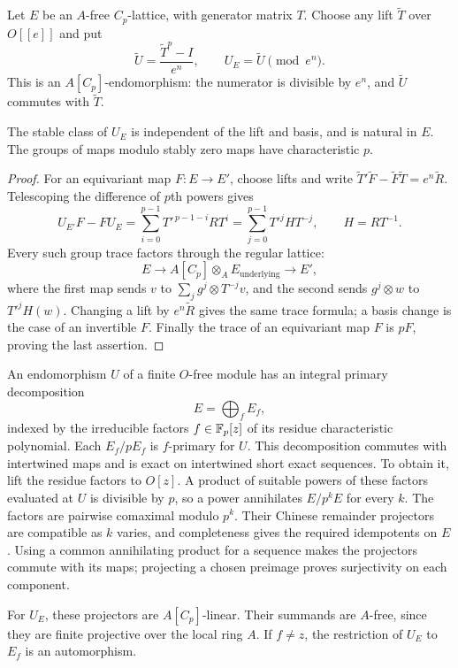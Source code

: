 Let $E$ be an $A$-free $C_p$-lattice, with generator matrix $T$.
Choose any lift $\widetilde T$ over $O[[e]]$ and put
\[
 \widetilde U=\frac{\widetilde T^p-I}{e^n},\qquad
 U_E=\widetilde U\pmod{e^n}.
\]
This is an $A[C_p]$-endomorphism: the numerator is divisible
by $e^n$, and $\widetilde U$ commutes with $\widetilde T$.

\begin{lemma}\label{lem:truncation-stable-curvature}
The stable class of $U_E$ is independent of the lift and basis,
and is natural in $E$.  The groups of maps modulo stably zero maps
have characteristic $p$.
\end{lemma}

\begin{proof}
For an equivariant map $F:E\to E'$, choose lifts and write
$\widetilde T'\widetilde F-\widetilde F\widetilde T=e^n\widetilde R$.
Telescoping the difference of $p$th powers gives
\[
 U_{E'}F-FU_E
  =\sum_{i=0}^{p-1}T'^{\,p-1-i}RT^i
  =\sum_{j=0}^{p-1}T'^j H T^{-j},\qquad H=RT^{-1}.
\]
Every such group trace factors through the regular lattice:
\[
 E\longrightarrow A[C_p]\otimes_A E_{\mathrm{underlying}}
       \longrightarrow E',
\]
where the first map sends $v$ to
$\sum_jg^j\otimes T^{-j}v$, and the second sends
$g^j\otimes w$ to $T'^jH(w)$.
Changing a lift by $e^n\widetilde R$ gives the same trace formula;
a basis change is the case of an invertible $F$.
Finally the trace of an equivariant map $F$ is $pF$, proving the
last assertion.
\end{proof}

An endomorphism $U$ of a finite $O$-free module has an integral
primary decomposition
\[
 E=\bigoplus_f E_f,
\]
indexed by the irreducible factors $f\in\mathbb F_p[z]$ of its residue
characteristic polynomial.  Each $E_f/pE_f$ is $f$-primary for $U$.
This decomposition commutes with intertwined maps and is exact on
intertwined short exact sequences.  To obtain it, lift the residue
factors to $O[z]$.  A product of suitable powers of these factors
evaluated at $U$ is divisible by $p$, so a power annihilates
$E/p^kE$ for every $k$.  The factors are pairwise comaximal modulo
$p^k$.  Their Chinese remainder projectors are compatible as $k$
varies, and completeness gives the required idempotents on $E$.
Using a common annihilating product for a sequence makes the
projectors commute with its maps; projecting a chosen preimage
proves surjectivity on each component.

For $U_E$, these projectors are $A[C_p]$-linear.  Their summands are
$A$-free, since they are finite projective over the local ring $A$.
If $f\ne z$, the restriction of $U_E$ to $E_f$ is an automorphism.

